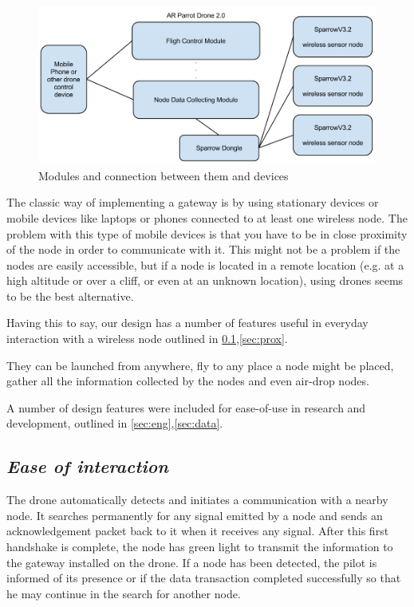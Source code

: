 \label{chap:arch}

\begin{figure}[ht] \centering
\includegraphics[width=1\textwidth]{img/organigrama.png}
\caption{Modules and connection between them and devices} \end{figure}

The classic way of implementing a gateway is by using stationary devices or mobile devices like laptops or phones connected to at least one wireless node. The problem with this type of mobile devices is that you have to be in close proximity of the node in order to communicate with it. This might not be a problem if the nodes are easily accessible, but if a node is located in a remote location (e.g. at a high altitude or over a cliff, or even at an unknown location), using drones seems to be the best alternative.

Having this to say, our design has a number of features useful in everyday interaction with a wireless node outlined in \ref{sec:inter},\ref{sec:prox}. 

They can be launched from anywhere, fly to any place a node might be placed, gather all the information collected by the nodes and even air-drop nodes.

A number of design features were included for ease-of-use in
research and development, outlined in \ref{sec:eng},\ref{sec:data}.


\subsection{\textit{Ease of interaction}} 

\label{sec:inter}

The drone automatically detects and initiates a communication with a nearby node. It searches permanently for any signal emitted by a node and sends an acknowledgement packet back to it when it receives any signal. After this first handshake is complete, the node has green light to transmit the information to the gateway installed on the drone. If a node has been detected, the pilot is informed of its presence or if the data transaction completed successfully so that he may continue in the search for another node.

